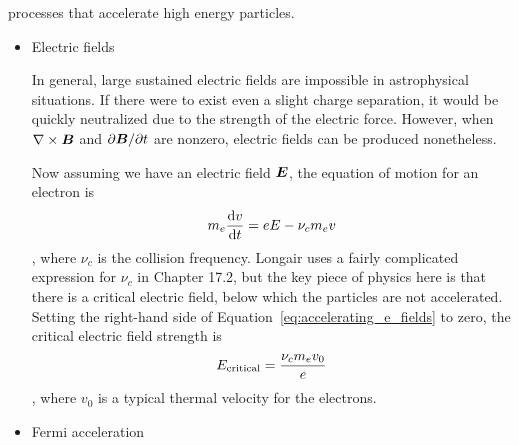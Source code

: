 \begin{enumerate}
\begin{itemize}
      \end{itemize}

       processes that accelerate high energy particles.
      \begin{itemize}
      \item Electric fields

            In general, large sustained electric fields are impossible in astrophysical situations.
            If there were to exist even a slight charge separation, it would be quickly
            neutralized due to the strength of the electric force.
            However, when $\nabla\times\boldsymbol B$ and $\partial\boldsymbol B/\partial t$ are nonzero, electric
            fields can be produced nonetheless.

            Now assuming we have an electric field $\boldsymbol E$, the equation of motion for an electron is
            \begin{dmath}\label{eq:accelerating_e_fields}
                m_e\frac{\d v}{\d t} = eE - \nu_cm_e v
            \end{dmath},
            where $\nu_c$ is the collision frequency.  Longair uses a fairly complicated
            expression for $\nu_c$ in Chapter 17.2, but the key piece of physics here is that
            there is a critical electric field, below which the particles are not accelerated.
            Setting the right-hand side of Equation~\ref{eq:accelerating_e_fields} to zero,
            the critical electric field strength is
            \begin{dmath}
                E_{\rm critical} = \frac{\nu_cm_ev_0}{e}
            \end{dmath},
            where $v_0$ is a typical thermal velocity for the electrons.

      \item Fermi acceleration


\end{itemize}
\end{enumerate}
